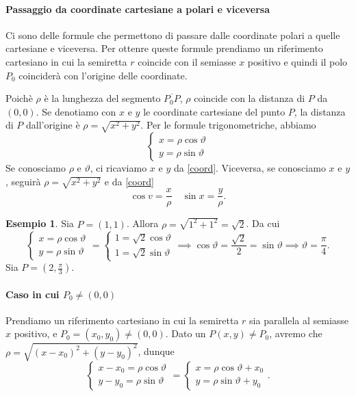 \documentclass{article}
\theoremstyle{plain}
\theoremstyle{definition}
\newtheorem{exmp}{Esempio}[section]
\theoremstyle{remark}
\begin{document}
\paragraph{Passaggio da coordinate cartesiane a polari e viceversa}
Ci sono delle formule che permettono di passare dalle coordinate polari a quelle cartesiane e viceversa. 
Per ottenre queste formule prendiamo un riferimento cartesiano in cui la semiretta $r$ coincide con il semiasse $x$ positivo e quindi il polo $P_0$ coinciderà con l'origine delle coordinate.

Poichè $\rho$ è la lunghezza del segmento $\overline{P_0P}$, $\rho$ coincide con la distanza di $P$ da $(0,0)$. 
Se denotiamo con $x$ e $y$ le coordinate cartesiane del punto $P$, 
la distanza di $P$ dall'origine è $\rho=\sqrt{x^2+y^2}$.
Per le formule trigonometriche, abbiamo
\begin{equation}
    \begin{cases}
        x=\rho\cos \vartheta\\
        y=\rho\sin \vartheta
    \end{cases}\label{coord}  
\end{equation}
Se conosciamo $\rho$ e $\vartheta$, ci ricaviamo $x$ e $y$ da \ref{coord}. 
Viceversa, se conosciamo $x$ e $y$, seguirà $\rho=\sqrt{x^2+y^2}$ e da \ref{coord} 
\[\cos v=\dfrac{x}{\rho}\quad \sin x=\dfrac{y}{\rho}.\]

\vspace{10pt}

\begin{exmp}
    Sia $P=(1,1)$. Allora $\rho=\sqrt{1^2+1^2}=\sqrt{2}$. Da cui 
    \[\begin{cases}
        x=\rho\cos\vartheta\\
        y=\rho\sin\vartheta
    \end{cases}=\begin{cases}
        1=\sqrt{2}\cos\vartheta\\
        1=\sqrt{2}\sin\vartheta
    \end{cases}\implies \cos\vartheta=\dfrac{\sqrt{2}}{2}=\sin\vartheta\implies \vartheta=\dfrac{\pi}{4}.\]
    Sia $P=(2,\frac{\pi}{3})$.
\end{exmp}

\vspace{10pt}

\paragraph{Caso in cui $P_0\neq(0,0)$}
Prendiamo un riferimento cartesiano in cui la semiretta $r$ sia parallela al semiasse $x$ positivo, e $P_0=(x_0,y_0)\neq(0,0)$.
Dato un $P(x,y)\neq P_0$, avremo che $\rho=\sqrt{(x-x_0)^2+(y-y_0)^2}$, dunque 
\[\begin{cases}
        x-x_0=\rho\cos\vartheta\\
        y-y_0=\rho\sin\vartheta
    \end{cases}=\begin{cases}
        x=\rho\cos\vartheta+x_0\\
        y=\rho\sin\vartheta+y_0
    \end{cases}.\]
\end{document}

